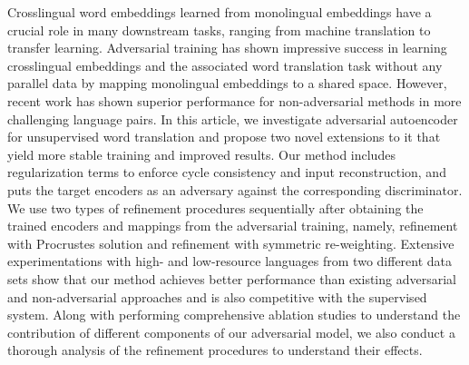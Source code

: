 Crosslingual word embeddings learned from monolingual embeddings have a crucial role in many downstream tasks, ranging from machine translation to transfer learning. Adversarial training has shown impressive success in learning crosslingual embeddings and the associated word translation task without any parallel data by mapping monolingual embeddings to a shared space. However, recent work has shown superior performance for non-adversarial methods in more challenging language pairs. In this article, we investigate adversarial autoencoder for unsupervised word translation and propose two novel extensions to it that yield more stable training and improved results. Our method includes regularization terms to enforce cycle consistency and input reconstruction, and puts the target encoders as an adversary against the corresponding discriminator. We use two types of refinement procedures sequentially after obtaining the trained encoders and mappings from the adversarial training, namely, refinement with Procrustes solution and refinement with symmetric re-weighting. Extensive experimentations with high- and low-resource languages from two different data sets show that our method achieves better performance than existing adversarial and non-adversarial approaches and is also competitive with the supervised system. Along with performing comprehensive ablation studies to understand the contribution of different components of our adversarial model, we also conduct a thorough analysis of the refinement procedures to understand their effects.